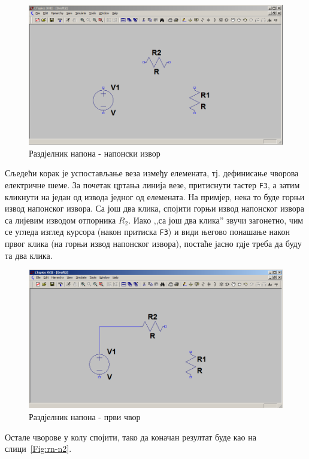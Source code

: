 \begin{figure}[h]
\centering
\includegraphics[width=\figwidth\textwidth]{figs/rn-v.PNG}
\caption{Раздјелник напона - напонски извор}
\label{Fig:rn-v}
\end{figure}

Сљедећи корак је успостављање веза између елемената, тј. дефинисање чворова електричне шеме. За почетак цртања линија везе, притиснути тастер \texttt{F3}, а затим кликнути на један од извода једног од елемената. На примјер, нека то буде горњи извод напонског извора. Са још два клика, спојити горњи извод напонског извора са лијевим изводом отпорника $R_2$. Иако ,,са још два клика'' звучи загонетно, чим се угледа изглед курсора (након притиска \texttt{F3}) и види његово понашање након првог клика (на горњи извод напонског извора), постаће јасно гдје треба да буду та два клика.

\begin{figure}[h]
\centering
\includegraphics[width=\figwidth\textwidth]{figs/rn-n1.PNG}
\caption{Раздјелник напона - први чвор}
\label{Fig:rn-n1}
\end{figure}

Остале чворове у колу спојити, тако да коначан резултат буде као на слици~\ref{Fig:rn-n2}.


